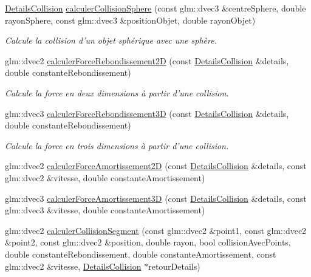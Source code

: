 \begin{DoxyCompactItemize}
\hyperlink{classaidecollision_1_1_details_collision}{Details\-Collision} \hyperlink{namespaceaidecollision_afb42c7c2bd75a26500296a5d48cc34f2}{calculer\-Collision\-Sphere} (const glm\-::dvec3 \&centre\-Sphere, double rayon\-Sphere, const glm\-::dvec3 \&position\-Objet, double rayon\-Objet)
\begin{DoxyCompactList}\small\item\em Calcule la collision d'un objet sphérique avec une sphère. \end{DoxyCompactList}\item 
glm\-::dvec2 \hyperlink{namespaceaidecollision_a6c62a46261f0a8dbb568ab7f620f2f16}{calculer\-Force\-Rebondissement2\-D} (const \hyperlink{classaidecollision_1_1_details_collision}{Details\-Collision} \&details, double constante\-Rebondissement)
\begin{DoxyCompactList}\small\item\em Calcule la force en deux dimensions à partir d'une collision. \end{DoxyCompactList}\item 
glm\-::dvec3 \hyperlink{namespaceaidecollision_adaff1cd85032a877a7cae37f948e7f99}{calculer\-Force\-Rebondissement3\-D} (const \hyperlink{classaidecollision_1_1_details_collision}{Details\-Collision} \&details, double constante\-Rebondissement)
\begin{DoxyCompactList}\small\item\em Calcule la force en trois dimensions à partir d'une collision. \end{DoxyCompactList}\item 
glm\-::dvec2 \hyperlink{namespaceaidecollision_aba912d7b8b6e2f274c56b8ed74a98294}{calculer\-Force\-Amortissement2\-D} (const \hyperlink{classaidecollision_1_1_details_collision}{Details\-Collision} \&details, const glm\-::dvec2 \&vitesse, double constante\-Amortissement)
\item 
glm\-::dvec3 \hyperlink{namespaceaidecollision_a126c9fdb84004900df0a81728d91d08b}{calculer\-Force\-Amortissement3\-D} (const \hyperlink{classaidecollision_1_1_details_collision}{Details\-Collision} \&details, const glm\-::dvec3 \&vitesse, double constante\-Amortissement)
\item 
glm\-::dvec2 \hyperlink{namespaceaidecollision_accd9249f53427a1eb943b9ce006c4d9b}{calculer\-Collision\-Segment} (const glm\-::dvec2 \&point1, const glm\-::dvec2 \&point2, const glm\-::dvec2 \&position, double rayon, bool collision\-Avec\-Points, double constante\-Rebondissement, double constante\-Amortissement, const glm\-::dvec2 \&vitesse, \hyperlink{classaidecollision_1_1_details_collision}{Details\-Collision} $\ast$retour\-Details)

\end{DoxyCompactItemize}

